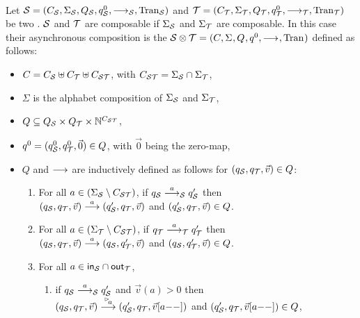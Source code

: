 \begin{definition}\label{def:async-comp-aiots}~\\
Let $\S = \aiotstup{\S}$ and $\T = \aiotstup{\T}$ be two \AIOTSs. $\S$ and $\T$ are composable if $\Sigma_\S$ and $\Sigma_\T$ are composable. In this case their asynchronous composition is the \AIOTS $\S \compos \T = \aiotstup{}$ defined as follows:
\begin{itemize}
    \item $\chan = \chan_\S \uplus \chan_\T \uplus \chan_{\S\T}$, with $\chan_{\S\T} = \Sigma_\S \cap \Sigma_\T$,
    \item $\Sigma$ is the alphabet composition of $\Sigma_\S$ and $\Sigma_\T$,
    \item $Q \subseteq Q_\S \times Q_\T \times \N^{\chan_{\S\T}} $,
    \item $q^0= (q^0_\S,q^0_\T,\vec{0}) \in Q$, with $\vec{0}$ being the zero-map,
    \item $Q$ and $\goes{}$ are inductively defined as follows for $(q_\S,q_\T,\vec{v}) \in Q $:
\vspace{1mm}
    \begin{enumerate}[label=\arabic*:, ref=(\arabic*), leftmargin=*]
        \item\label{def:trans:s} For all $a \in (\Sigma_\S \setminus \chan_{\S\T}) %
        $,
                if $q_\S \goes{a}_\S q'_\S$ then \\ $(q_\S, q_\T, \vec{v}) \goes{a} (q'_\S, q_\T, \vec{v})$ and $(q'_\S, q_\T, \vec{v}) \in Q$.
\vspace{1mm}
        \item\label{def:trans:t} For all $a \in (\Sigma_\T \setminus \chan_{\S\T}) %
        $,
                if $q_\T \goes{a}_\T q'_\T$ then \\ $(q_\S, q_\T, \vec{v}) \goes{a} (q_\S, q'_\T, \vec{v})$ and $(q_\S, q'_\T, \vec{v}) \in Q$.
\vspace{1mm}
        \item\label{def:trans:stot} For all $a \in \inset_\S \cap \outset_\T$,
\vspace{1mm}
                \begin{enumerate}[label=3.\arabic*:, ref=(3.\arabic*), leftmargin=*]
                    \item\label{def:trans:stots} if $q_\S \goes{a}_\S q'_\S$  and $\vec v (a) > 0$
 then \\ $(q_\S, q_\T, \vec{v}) \goes{\inact{a}} (q'_\S, q_\T, \vec{v}[a\mathrm{--}])$ and  $(q'_\S, q_\T, \vec{v}[a\mathrm{--}]) \in Q$,

\end{enumerate}
\end{enumerate}
\end{itemize}
\end{definition}
